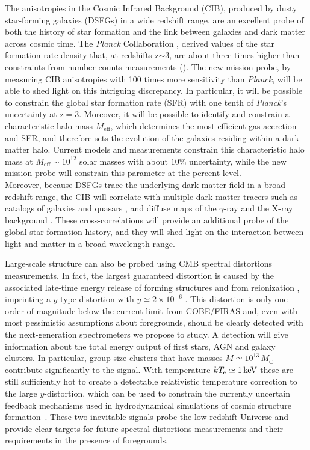 The anisotropies in the Cosmic Infrared Background (CIB), produced by
dusty star-forming galaxies (DSFGs) in a wide redshift range, are
an excellent probe of both the history of star formation and the link between
galaxies and dark matter across cosmic time. The {\it Planck} Collaboration \citep{planck2014-XXX,planckXVIII},
derived values of the star formation rate density that,
at redshifts z$\mathrm{\sim3}$, are about three times higher
than constraints from number counts measurements (\cite{madau2014}).
The new mission probe, by measuring CIB anisotropies with 100 times more
sensitivity than {\it Planck}, will be able to shed light on this intriguing
discrepancy. In particular, it will be possible to constrain the global star formation rate (SFR)
with one tenth of {\it Planck}'s uncertainty
at z$\mathrm{=3}$. Moreover, it will be possible to identify and constrain a
characteristic halo mass $M_{\mathrm{eff}}$,
which determines the most efficient gas accretion and SFR, and
therefore sets the evolution of the galaxies residing within
a dark matter halo. Current models and measurements
constrain this characteristic halo mass at
$M_{\mathrm{eff}}\sim 10^{12}$ solar masses with about $\mathrm{10\%}$
uncertainty, while the new mission probe will
constrain this parameter at the percent level.\\
Moreover, because DSFGs trace the underlying dark matter
field in a broad redshift range, the CIB will
correlate with multiple dark matter
tracers such as catalogs of galaxies and quasars
\citep{serra2014,wang2015},
and diffuse maps of the $\gamma$-ray and
the X-ray background \citep{cooray2016}.
These cross-correlations will provide an additional probe of the
global star formation history, and they
will shed light on the interaction between light and matter
in a broad wavelength range.

Large-scale structure can also be probed using CMB spectral distortions measurements. In fact, the largest guaranteed distortion is caused by the associated late-time energy release of forming structures and from reionization \citep{Sunyaev1972b, Hu1994pert, Oh2003, Cen1999, Refregier2000}, imprinting a $y$-type distortion 
with $y \simeq 2\times 10^{-6}$ \citep[e.g.,][]{Refregier2000, Hill2015}. This distortion is only one order of magnitude below the current limit from COBE/FIRAS and, even with most pessimistic assumptions about foregrounds, should be clearly detected with the next-generation spectrometers we propose to study. A detection will give information about the total energy output of first stars, AGN and galaxy clusters. In particular, group-size clusters that have masses $M\simeq 10^{13}\,M_{\odot}$ contribute significantly to the signal. With temperature $k T_{\rm e}\simeq 1\,{\rm keV}$ these are still sufficiently hot to create a detectable relativistic temperature correction to the large $y$-distortion, 
which can be used to constrain the currently uncertain feedback mechanisms used in hydrodynamical simulations
of cosmic structure formation~\citep{Hill2015}. These two inevitable signals probe the low-redshift 
Universe and provide clear targets for future spectral distortions measurements and their requirements in the presence of foregrounds.

